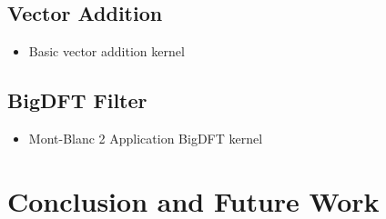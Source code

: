 \documentclass[11pt, a4paper, twoside]{montblanc2}
\begin{document}
  \subsection{Vector Addition}
\begin{itemize}
  \item Basic vector addition kernel
\end{itemize}

  \subsection{BigDFT Filter}
\begin{itemize}
  \item Mont-Blanc 2 Application BigDFT kernel
\end{itemize}

\section{Conclusion and Future Work}



\end{document}
